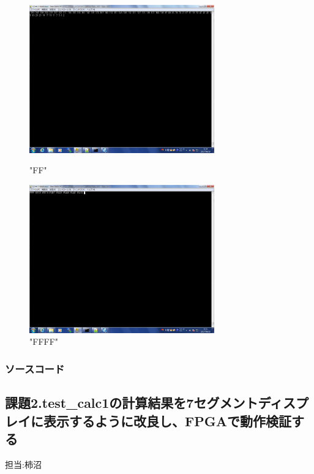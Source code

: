 \documentclass{jsarticle}
\begin{document}
\begin{figure}[htbp]
 \begin{minipage}{0.5\hsize}
  \begin{center}
  \includegraphics[width=8cm,bb=0 0 1280 1024]{FFout.png}
  \end{center}
  \caption{"FF"}
 \end{minipage}
 \begin{minipage}{0.5\hsize}
  \begin{center}
   \includegraphics[width=8cm,bb=0 0 1280 1024]{FFFFinout.png}
  \end{center}
  \caption{"FFFF"}
 \end{minipage}
\end{figure}

\newpage

\subsubsection*{ソースコード}




\newpage


\subsection*{課題2.test\_calc1の計算結果を7セグメントディスプレイに表示するように改良し、FPGAで動作検証する}
担当:柿沼\\
\end{document}
